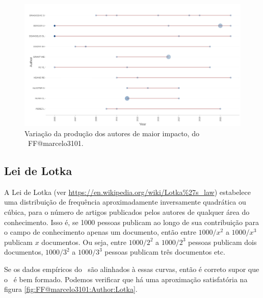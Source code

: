 \begin{figure}
    \centering
    \includegraphics[width=1\textwidth]{exploratory-data-analysis/marcelo3101/PesqBibliogr/ForestFire/WoS-20221204/assets/AuthorsProductionOverTimeFFmarcelo3101.png}
    \caption{Variação da produção dos autores de maior impacto, do \dataset\ FF@marcelo3101.}
    \label{fig:FF@marcelo3101:Author:TopAuthorsProductionOverTime}
\end{figure}

\subsection{Lei de Lotka}

A Lei de Lotka (ver \url{https://en.wikipedia.org/wiki/Lotka\%27s_law}) estabelece uma distribuição de frequência aproximadamente inversamente quadrática ou cúbica, para o número de artigos publicados pelos autores de qualquer área do conhecimento. Isso é, se 1000 pessoas publicam ao longo de sua contribuição para o campo de conhecimento apenas um documento, então
entre $1000/x^{2}$ a $1000/x^{3}$ publicam $x$ documentos. Ou seja, entre
$1000/2^{2}$ a $1000/2^{3}$ pessoas publicam dois documentos, $1000/3^{2}$ a $1000/3^{3}$ pessoas publicam três documentos etc.

Se os dados empíricos do \dataset\ são alinhados à essas curvas, então é correto supor que o \dataset\ é bem formado. Podemos verificar que há uma aproximação satisfatória na figura \ref{fig:FF@marcelo3101:Author:Lotka}.

